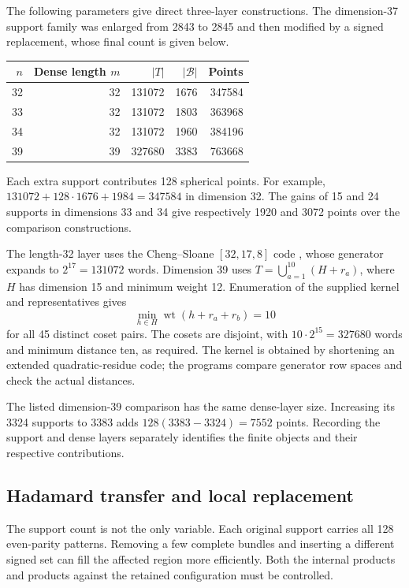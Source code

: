 The following parameters give direct three-layer constructions. The
dimension-37 support family was enlarged from 2843 to 2845 and then
modified by a signed replacement, whose final count is given below.
\begin{center}
\begin{minipage}{\linewidth}\centering
{}
\label{tab:code-parameters}
\begin{tabular}{rrrrr}
\toprule
$n$ & Dense length $m$ & $|T|$ & $|\mathcal B|$ & Points\\
\midrule
32&32&131072&1676&347584\\
33&32&131072&1803&363968\\
34&32&131072&1960&384196\\
39&39&327680&3383&763668\\
\bottomrule
\end{tabular}
\end{minipage}
\end{center}
Each extra support contributes 128 spherical points. For example,
$131072+128\cdot1676+1984=347584$ in dimension 32.
The gains of 15 and 24 supports in dimensions 33 and 34 give respectively
1920 and 3072 points over the comparison constructions.

The length-32 layer uses the Cheng--Sloane $[32,17,8]$ code
\cite{chengsloane}, whose generator expands to $2^{17}=131072$ words.
Dimension 39 uses $T=\bigcup_{a=1}^{10}(H+r_a)$, where $H$ has dimension
15 and minimum weight 12. Enumeration of the supplied kernel and
representatives gives
\[
\min_{h\in H}\operatorname{wt}(h+r_a+r_b)=10
\]
for all 45 distinct coset pairs. The cosets are disjoint, with
$10\cdot2^{15}=327680$ words and minimum distance ten, as required.
The kernel is obtained by shortening an extended quadratic-residue code;
the programs compare generator row spaces and check the actual distances.

The listed dimension-39 comparison has the same dense-layer size.
Increasing its 3324 supports to 3383 adds $128(3383-3324)=7552$ points.
Recording the support and dense layers separately identifies the finite
objects and their respective contributions.

\subsection{Hadamard transfer and local replacement}

The support count is not the only variable. Each original support carries
all 128 even-parity patterns. Removing a few complete bundles and inserting
a different signed set can fill the affected region more efficiently.
Both the internal products and products against the retained configuration
must be controlled.

